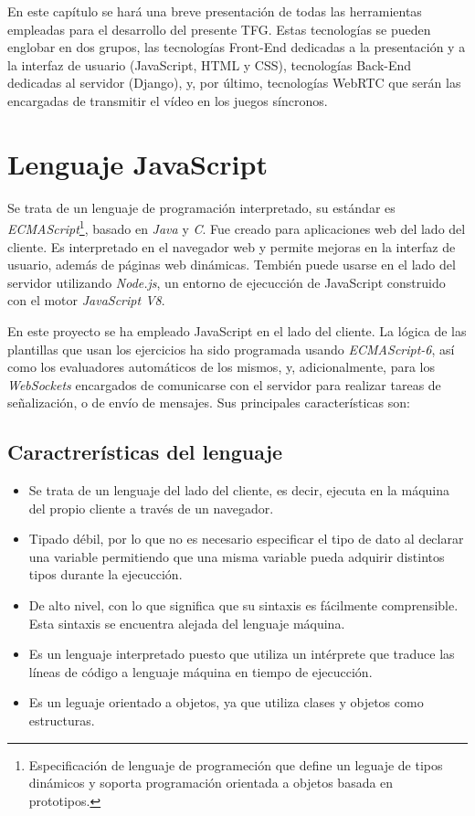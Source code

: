 \documentclass[a4paper, 12pt]{book}
\begin{document}
En este capítulo se hará una breve presentación de todas las herramientas empleadas para el desarrollo del presente TFG. Estas tecnologías se pueden englobar en dos grupos, las tecnologías Front-End dedicadas a la presentación y a la interfaz de usuario (JavaScript, HTML y CSS), tecnologías Back-End dedicadas al servidor (Django), y, por último, tecnologías WebRTC que serán las encargadas de transmitir el vídeo en los juegos síncronos. 

\section{Lenguaje JavaScript}
\label{sec:javascript}

Se trata de un lenguaje de programación interpretado, su estándar es \textit{ECMAScript}\footnote{Especificación de lenguaje de programeción que define un leguaje de tipos dinámicos y soporta programación orientada a objetos basada en prototipos.}, basado en \textit{Java} y \textit{C}. Fue creado para aplicaciones web del lado del cliente. Es interpretado en el navegador web y permite mejoras en la interfaz de usuario, además de páginas web dinámicas. Tembién puede usarse en el lado del servidor utilizando \textit{Node.js}, un entorno de ejecucción de JavaScript construido con el motor \textit{JavaScript V8}.

En este proyecto se ha empleado JavaScript en el lado del cliente. La lógica de las plantillas que usan los ejercicios ha sido programada usando \textit{ECMAScript-6}, así como los evaluadores automáticos de los mismos, y, adicionalmente, para los \textit{WebSockets} encargados de comunicarse con el servidor para realizar tareas de señalización, o de envío de mensajes. Sus principales características son:

\subsection{Caractrerísticas del lenguaje}
\label{subsec:javascript}

\begin{itemize}
	\item Se trata de un lenguaje del lado del cliente, es decir, ejecuta en la máquina del propio cliente a través de un navegador.
	
	\item Tipado débil, por lo que no es necesario especificar el tipo de dato al declarar una variable permitiendo que una misma variable pueda adquirir distintos tipos durante la ejecucción.
	
	\item De alto nivel, con lo que significa que su sintaxis es fácilmente comprensible. Esta sintaxis se encuentra alejada del lenguaje máquina.
	
	\item Es un lenguaje interpretado puesto que utiliza un intérprete que traduce las líneas de código a lenguaje máquina en tiempo de ejecucción.

	\item Es un leguaje orientado a objetos, ya que utiliza clases y objetos como estructuras.
\end{itemize}
\end{document}
